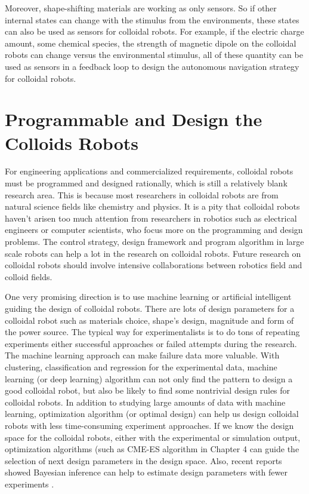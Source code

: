 Moreover, shape-shifting materials are working as only sensors. So if other internal states can change with the stimulus from the environments, these states can also be used as sensors for colloidal robots. For example, if the electric charge amount, some chemical species, the strength of magnetic dipole on the colloidal robots can change versus the environmental stimulus, all of these quantity can be used as sensors in a feedback loop to design the autonomous navigation strategy for colloidal robots.




\section{Programmable and Design the Colloids Robots}
For engineering applications and commercialized requirements, colloidal robots must be programmed and designed rationally, which is still a relatively blank research area. This is because most researchers in colloidal robots are from natural science fields like chemistry and physics. It is a pity that colloidal robots haven't arisen too much attention from researchers in robotics such as electrical engineers or computer scientists, who focus more on the programming and design problems\autocite{das2019cellular}.  The control strategy, design framework and program algorithm in large scale robots can help a lot in the research on colloidal robots.  Future research on colloidal robots should involve intensive collaborations between robotics field and colloid fields.

One very promising  direction is to use machine learning or artificial intelligent guiding the design of colloidal robots. There are lots of design parameters for a colloidal robot such as materials choice, shape's design, magnitude and form of the power source. The typical way for experimentalists is to do tons of repeating experiments either successful approaches or failed attempts during the research. The machine learning approach can make failure data more valuable. With clustering, classification and regression for the experimental data, machine learning (or deep learning) algorithm can not only find the pattern to design a good colloidal robot, but also be likely to find some nontrivial design rules for colloidal robots. In addition to studying large amounts of data with machine learning, optimization algorithm (or optimal design) can help us design colloidal robots with less time-consuming experiment approaches. If we know the design space for the colloidal robots, either with the experimental or simulation output, optimization algorithms (such as CME-ES algorithm in Chapter 4 can guide the selection of next design parameters in the design space. Also, recent reports showed Bayesian inference can help to estimate design parameters with fewer experiments \autocite{winslow2019characterization}.



